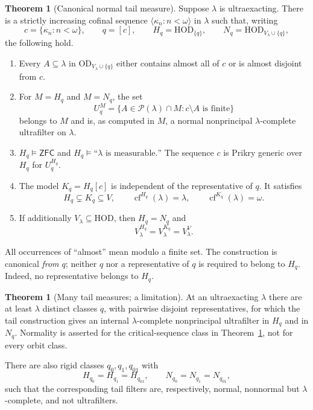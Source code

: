 \documentclass[11pt,letterpaper]{article}
\theoremstyle{definition}
\newtheorem{theorem}[definition]{Theorem}
\numberwithin{equation}{section}
\newcommand{\ZFC}{\mathsf{ZFC}}
\newcommand{\HOD}{\mathrm{HOD}}
\newcommand{\OD}{\mathrm{OD}}
\newcommand{\cf}{\operatorname{cf}}
\newcommand{\Pow}{\mathcal P}
\begin{document}
\begin{theorem}[Canonical normal tail measure]\label{thm:main}
Suppose $\lambda$ is ultraexacting. There is a strictly increasing cofinal sequence $\langle\kappa_n:n<\omega\rangle$ in $\lambda$ such that, writing
\[
 c=\{\kappa_n:n<\omega\},\qquad q=[c],\qquad
 H_q=\HOD_{\{q\}},\qquad N_q=\HOD_{V_\lambda\cup\{q\}},
\]
the following hold.
\begin{enumerate}
\item Every $A\subseteq\lambda$ in $\OD_{V_\lambda\cup\{q\}}$ either contains almost all of $c$ or is almost disjoint from $c$.
\item For $M=H_q$ and $M=N_q$, the set
\[
 U_q^M=\{A\in\Pow(\lambda)\cap M:c\setminus A\text{ is finite}\}
\]
belongs to $M$ and is, as computed in $M$, a normal nonprincipal $\lambda$-complete ultrafilter on $\lambda$.
\item $H_q\models\ZFC$ and $H_q\models\text{``$\lambda$ is measurable.''}$ The sequence $c$ is Prikry generic over $H_q$ for $U_q^{H_q}$.
\item The model $K_q=H_q[c]$ is independent of the representative of $q$. It satisfies
\[
 H_q\subsetneq K_q\subseteq V,\qquad
 \cf^{H_q}(\lambda)=\lambda,\qquad \cf^{K_q}(\lambda)=\omega.
\]
\item If additionally $V_\lambda\subseteq\HOD$, then $H_q=N_q$ and
\[
 V_\lambda^{H_q}=V_\lambda^{K_q}=V_\lambda^V.
\]
\end{enumerate}
\end{theorem}

All occurrences of ``almost'' mean modulo a finite set. The construction is canonical \emph{from $q$}; neither $q$ nor a representative of $q$ is required to belong to $H_q$. Indeed, no representative belongs to $H_q$.

\begin{theorem}[Many tail measures; a limitation]\label{thm:many-main}
At an ultraexacting $\lambda$ there are at least $\lambda$ distinct classes $q$, with pairwise disjoint representatives, for which the tail construction gives an internal $\lambda$-complete nonprincipal ultrafilter in $H_q$ and in $N_q$. Normality is asserted for the critical-sequence class in Theorem~\ref{thm:main}, not for every orbit class.

There are also rigid classes $q_0,q_1,q_{01}$ with
\[
 H_{q_0}=H_{q_1}=H_{q_{01}},\qquad
 N_{q_0}=N_{q_1}=N_{q_{01}},
\]
such that the corresponding tail filters are, respectively, normal, nonnormal but $\lambda$-complete, and not ultrafilters.
\end{theorem}
\end{document}
